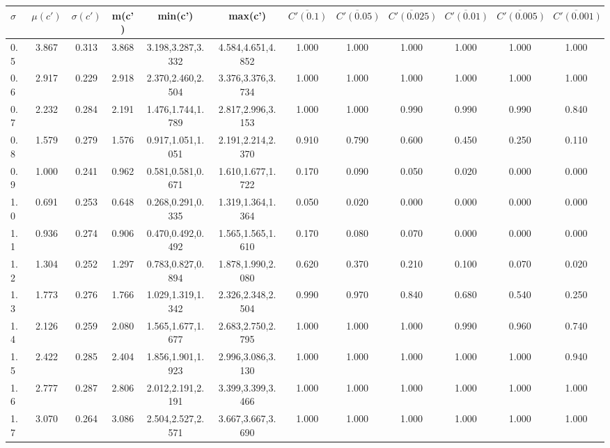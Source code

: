 \begin{table*}[h!]
\begin{center}
\begin{tabular}{| l | c | c | c | c | c | c | c | c | c | c | c |}\hline
$\sigma$ & $\mu(c')$ & $\sigma(c')$ & m(c') & min(c') & max(c') & $\overline{C'(0.1)}$ & $\overline{C'(0.05)}$ & $\overline{C'(0.025)}$ & $\overline{C'(0.01)}$ & $\overline{C'(0.005)}$ & $\overline{C'(0.001)}$ \\\hline
0.5 & 3.867 & 0.313 & 3.868 & 3.198,3.287,3.332 & 4.584,4.651,4.852  & 1.000  & 1.000  & 1.000  & 1.000  & 1.000  & 1.000 \\\hline
0.6 & 2.917 & 0.229 & 2.918 & 2.370,2.460,2.504 & 3.376,3.376,3.734  & 1.000  & 1.000  & 1.000  & 1.000  & 1.000  & 1.000 \\\hline
0.7 & 2.232 & 0.284 & 2.191 & 1.476,1.744,1.789 & 2.817,2.996,3.153  & 1.000  & 1.000  & 0.990  & 0.990  & 0.990  & 0.840 \\\hline
0.8 & 1.579 & 0.279 & 1.576 & 0.917,1.051,1.051 & 2.191,2.214,2.370  & 0.910  & 0.790  & 0.600  & 0.450  & 0.250  & 0.110 \\\hline
0.9 & 1.000 & 0.241 & 0.962 & 0.581,0.581,0.671 & 1.610,1.677,1.722  & 0.170  & 0.090  & 0.050  & 0.020  & 0.000  & 0.000 \\\hline
1.0 & 0.691 & 0.253 & 0.648 & 0.268,0.291,0.335 & 1.319,1.364,1.364  & 0.050  & 0.020  & 0.000  & 0.000  & 0.000  & 0.000 \\\hline
1.1 & 0.936 & 0.274 & 0.906 & 0.470,0.492,0.492 & 1.565,1.565,1.610  & 0.170  & 0.080  & 0.070  & 0.000  & 0.000  & 0.000 \\\hline
1.2 & 1.304 & 0.252 & 1.297 & 0.783,0.827,0.894 & 1.878,1.990,2.080  & 0.620  & 0.370  & 0.210  & 0.100  & 0.070  & 0.020 \\\hline
1.3 & 1.773 & 0.276 & 1.766 & 1.029,1.319,1.342 & 2.326,2.348,2.504  & 0.990  & 0.970  & 0.840  & 0.680  & 0.540  & 0.250 \\\hline
1.4 & 2.126 & 0.259 & 2.080 & 1.565,1.677,1.677 & 2.683,2.750,2.795  & 1.000  & 1.000  & 1.000  & 0.990  & 0.960  & 0.740 \\\hline
1.5 & 2.422 & 0.285 & 2.404 & 1.856,1.901,1.923 & 2.996,3.086,3.130  & 1.000  & 1.000  & 1.000  & 1.000  & 1.000  & 0.940 \\\hline
1.6 & 2.777 & 0.287 & 2.806 & 2.012,2.191,2.191 & 3.399,3.399,3.466  & 1.000  & 1.000  & 1.000  & 1.000  & 1.000  & 1.000 \\\hline
1.7 & 3.070 & 0.264 & 3.086 & 2.504,2.527,2.571 & 3.667,3.667,3.690  & 1.000  & 1.000  & 1.000  & 1.000  & 1.000  & 1.000 \\\hline

\end{tabular}
\end{center}
\end{table*}
